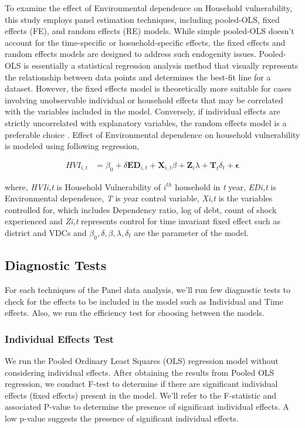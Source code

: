 To examine the effect of Environmental dependence on Household vulnerability, this study employs panel estimation techniques, including pooled-OLS, fixed effects (FE), and random effects (RE) models. While simple pooled-OLS doesn't account for the time-specific or hosuehold-specific effects, the fixed effects and random effects models are designed to address such endogenity issues. Pooled-OLS is essentially a statistical regression analysis method that visually represents the relationship between data points and determines the best-fit line for a dataset. However, the fixed effects model is theoretically more suitable for cases involving unobservable individual  or household effects that may be correlated with the variables included in the model. Conversely, if individual effects are strictly uncorrelated with explanatory variables, the random effects model is a preferable choice \citep{hsiao2022analysis}.   Effect of Environmental dependence on household vulnerability is modeled using
following regression,
\vspace{-\baselineskip}
\begin{center}
	\begin{align}
		\mathit{HVI}_{i,t} &= \beta_{0} + \delta \mathit{\mathbf{ED}_{i,t}} + \mathbf{X}_{i,t} \beta + \mathbf{Z}_i \lambda + \mathbf{T}_t \delta_t + \boldsymbol{\epsilon}\tag{5}
	\end{align}
\end{center}
where, \textit{HVIi,t} is Household Vulnerability of $i^{th}$ household in \textit{t} year, \textit{EDi,t} is Environmental dependence, \textit{T} is year control variable, \textit{Xi,t} is the variables controlled for, which includes Dependency ratio, log of debt, count of shock experienced and \textit{Zi,t} represents control for time invariant
fixed effect such as district and VDCs and $\beta_{0}, \delta, \beta, \lambda, \delta_t$ are the parameter of the model.\par 

\subsection{Diagnostic Tests}

For each techniques of the Panel data analysis, we'll run few diagnostic tests to check for the effects to be included in the model such as Individual and Time effects. Also, we run the efficiency test for choosing between the models.\par 

\subsubsection{Individual Effects Test} 
We run the Pooled Ordinary Least Squares (OLS) regression model without considering individual effects. After obtaining the results from Pooled OLS regression, we conduct F-test to determine if there are significant individual effects (fixed effects) present in the model. We'll refer to the F-statistic and associated P-value to determine the presence of significant individual effects.  A low p-value suggests the presence of significant individual effects.\par 


